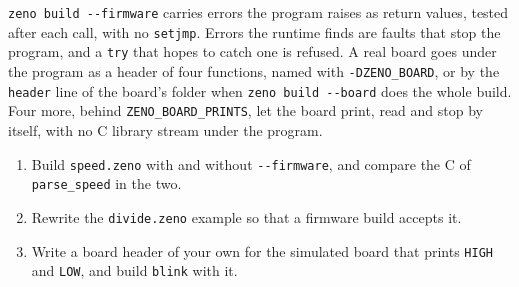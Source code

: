 \begin{summary}
\verb|zeno build --firmware| carries errors the program raises as
return values, tested after each call, with no \verb|setjmp|. Errors
the runtime finds are faults that stop the program, and a \verb|try|
that hopes to catch one is refused. A real board goes under the program
as a header of four functions, named with \verb|-DZENO_BOARD|, or by
the \verb|header| line of the board's folder when
\verb|zeno build --board| does the whole build. Four more, behind
\verb|ZENO_BOARD_PRINTS|, let the board print, read and stop by
itself, with no C library stream under the program.
\end{summary}

\begin{tryit}
\begin{enumerate}
\item Build \verb|speed.zeno| with and without \verb|--firmware|, and
  compare the C of \verb|parse_speed| in the two.
\item Rewrite the \verb|divide.zeno| example so that a firmware build
  accepts it.
\item Write a board header of your own for the simulated board that
  prints \verb|HIGH| and \verb|LOW|, and build \verb|blink| with it.
\end{enumerate}
\end{tryit}
